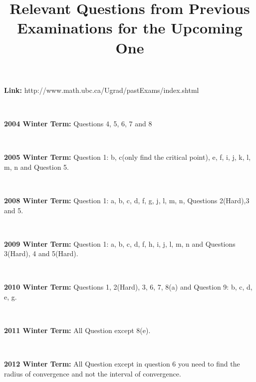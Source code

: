 \documentclass[oneside, book,10 pt]{amsart}
\title{Relevant Questions from Previous Examinations for the Upcoming One}
\numberwithin{equation}{section}
\begin{document}
\maketitle

\noindent\textbf{Link:} http://www.math.ubc.ca/Ugrad/pastExams/index.shtml

\

\noindent\textbf{2004 Winter Term: } Questions 4, 5, 6, 7 and  8

\

\noindent\textbf{2005 Winter Term: } Question 1: b, c(only find the critical point), e, f, i, j, k, l, m, n and Question 5.

\

\noindent\textbf{2008 Winter Term: } Question 1: a, b, c, d, f, g, j, l, m, n, Questions 2(Hard),3 and 5.

\

\noindent\textbf{2009 Winter Term: } Question 1: a, b, c, d, f, h, i, j, l, m, n and Questions 3(Hard), 4 and 5(Hard).

\

\noindent\textbf{2010 Winter Term: } Questions 1, 2(Hard), 3, 6, 7, 8(a) and Question 9: b, c, d, e, g.

\

\noindent\textbf{2011 Winter Term: } All Question except 8(e). 

\
 
\noindent\textbf{2012 Winter Term: } All Question except in question 6 you need to find the radius of convergence and not the interval of convergence. 
\end{document}
